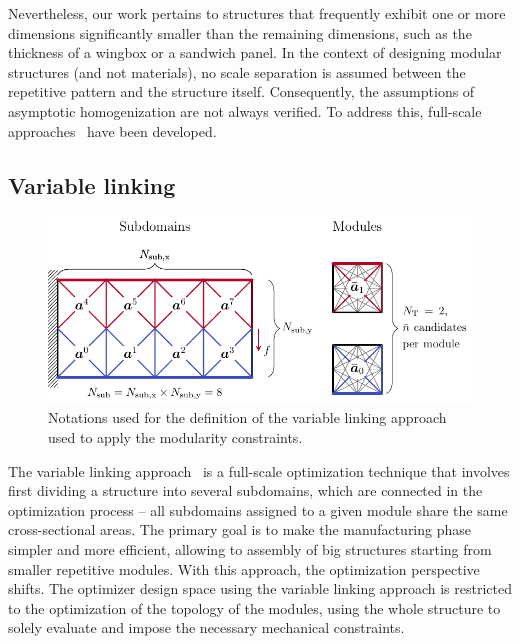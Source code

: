 Nevertheless, our work pertains to structures that frequently exhibit one or more dimensions significantly smaller than the remaining dimensions, such as the thickness of a wingbox or a sandwich panel. In the context of designing modular structures (and not materials), no scale separation is assumed between the repetitive pattern and the structure itself. Consequently, the assumptions of asymptotic homogenization are not always verified. To address this, full-scale approaches~ have been developed.

\subsection{Variable linking}
\begin{figure}
    \centering
    \includegraphics{figures/05_cellular_opt/00_modules_VL_bc/modules_bc.pdf}
    \caption{Notations used for the definition of the variable linking approach used to apply the modularity constraints.}
    \label{fig:05_VL}
\end{figure}

The variable linking approach~ is a full-scale optimization technique that involves first dividing a structure into several subdomains, which are connected in the optimization process -- \ie all subdomains assigned to a given module share the same cross-sectional areas. The primary goal is to make the manufacturing phase simpler and more efficient, allowing to assembly of big structures starting from smaller repetitive modules. With this approach, the optimization perspective shifts. The optimizer design space using the variable linking approach is restricted to the optimization of the topology of the modules, using the whole structure to solely evaluate and impose the necessary mechanical constraints.

